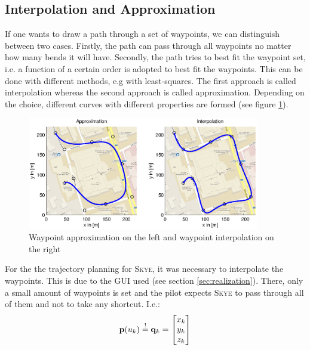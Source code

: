 




\subsection{Interpolation and Approximation}
If one wants to draw a path through a set of waypoints, we can distinguish between two cases. Firstly, the path can pass through all waypoints no matter how many bends it will have. Secondly, the path tries to best fit the waypoint set, i.e. a function of a  certain order is adopted to best fit the waypoints. This can be done with different methods, e.g with least-squares. The first approach is called interpolation whereas the second approach is called approximation. Depending on the choice, different curves with different properties are formed (see figure \ref{fig:ApproxInterpol}).  


\begin{figure}[H]
	\centering
    \includegraphics[width = 0.9\textwidth]{graphics/ApproxInterpol.eps}
  \caption{ Waypoint approximation on the left and waypoint interpolation on the right}
  \label{fig:ApproxInterpol}
\end{figure}

For the the trajectory planning for \textsc{Skye}, it was necessary to interpolate the waypoints. This is due to the GUI used (see section \ref{sec:realization}). There, only a small amount of waypoints is set and the pilot expects \textsc{Skye} to pass through all of them and not to take any shortcut. I.e.:
\begin{equation}
{\bf p}(u_k)\stackrel{!}{=}{\bf q}_k=\begin{bmatrix}x_k\\y_k\\z_k \end{bmatrix}
\end{equation}

